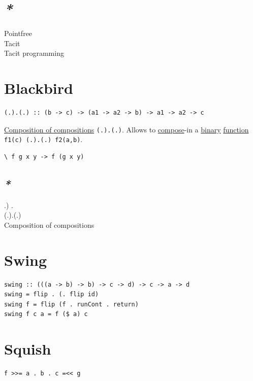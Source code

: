 \documentclass[a4paper,14pt,oneside]{book}
\begin{document}
\section{\emph{*}}
\label{sec:orgeb55456}

\label{org7ae47b1}Pointfree\\
\label{org5b31d0d}Tacit\\
\label{org5161191}Tacit programming\\

\section{\label{org21240b2}Blackbird}
\label{sec:org52c9af6}
\begin{verbatim}
(.).(.) :: (b -> c) -> (a1 -> a2 -> b) -> a1 -> a2 -> c
\end{verbatim}

\hyperref[org102696a]{Composition of compositions} \texttt{(.).(.)}. Allows to \hyperref[orge8e56ac]{compose}-in a \hyperref[org969957a]{binary} \hyperref[orge00b05b]{function} \texttt{f1(c) (.).(.) f2(a,b)}.\\
\begin{verbatim}
\ f g x y -> f (g x y)
\end{verbatim}

\subsection{\emph{*}}
\label{sec:org9f3f042}

\label{orgd5cdef3}.) .\\
\label{org1b9e920}(.).(.)\\
\label{org102696a}Composition of compositions\\

\section{\label{orgf547fb9}Swing}
\label{sec:org90f9a65}
\begin{verbatim}
swing :: (((a -> b) -> b) -> c -> d) -> c -> a -> d
swing = flip . (. flip id)
swing f = flip (f . runCont . return)
swing f c a = f ($ a) c
\end{verbatim}

\section{\label{orge7cbf7f}Squish}
\label{sec:org9fe4611}
\begin{verbatim}
f >>= a . b . c =<< g
\end{verbatim}
\end{document}
